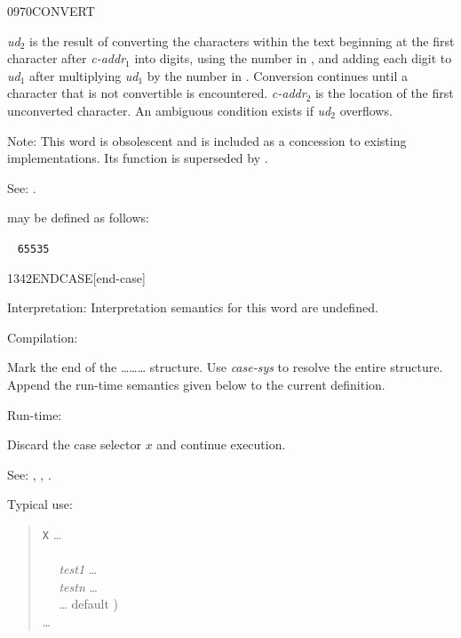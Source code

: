 \begin{newword}{0970}{CONVERT}

	\emph{ud}$_2$ is the result of converting the characters within
	the text beginning at the first character after \emph{c-addr}$_1$
	into digits, using the number in , and adding each
	digit to \emph{ud}$_1$ after multiplying \emph{ud}$_1$ by the
	number in . Conversion continues until a character
	that is not convertible is encountered. \emph{c-addr}$_2$ is
	the location of the first unconverted character. An ambiguous
	condition exists if \emph{ud}$_2$ overflows.

\item[Note:]
	This word is obsolescent and is included as a concession to
	existing implementations. Its function is superseded by
	.

\item[See:]
	.

	\begin{rationale} %
		 may be defined as follows:

		\tab \word{:} ~
			 \texttt{65535}  
		\word{;}
	\end{rationale}
\end{newword}


\begin{newword*}{1342}{ENDCASE}[end-case]
\item[Interpretation:]
	Interpretation semantics for this word are undefined.

\item[Compilation:]

	Mark the end of the
	\ldots{}\ldots{}\ldots{}
	structure. Use \emph{case-sys} to resolve the entire structure.
	Append the run-time semantics given below to the current
	definition.

\item[Run-time:]

	Discard the case selector $x$ and continue execution.

\item[See:]
	,
	,
	.

	\begin{rationale} %
		Typical use:
		\begin{quote}
			\word{:} \texttt{X} {\ldots} \\
			\tab {} \\
			\tab~~ \emph{test1}  {\ldots}  \\
			\tab~~ \emph{testn}  {\ldots}  \\
			\tab~~ {\ldots}  default ) \\
			\tab {} {\ldots} \\
			\word{;}
		\end{quote}
	\end{rationale}
\end{newword*}


